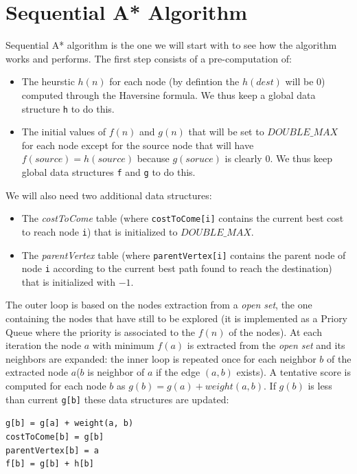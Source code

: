 \documentclass[twocolumn, switch]{article} %
\begin{document}
\section{Sequential A* Algorithm}
Sequential A* algorithm is the one we will start with to see how the algorithm works and performs.
The first step consists of a pre-computation of:
\begin{itemize}
  \item The heurstic $h(n)$ for each node (by defintion the $h(dest)$ will
        be 0) computed through the Haversine formula. We thus keep a global data
        structure \texttt{h} to do this.
  \item The initial values of $f(n)$ and $g(n)$ that will be set to $DOUBLE\_MAX$ for each
        node except for the source node that will have $f(source) = h(source)$ because 
        $g(soruce)$ is clearly $0$. We thus keep global data structures \texttt{f} and \texttt{g} to do this.
\end{itemize}
We will also need two additional data structures:
\begin{itemize}
  \item The \textit{costToCome} table (where \texttt{costToCome[i]} contains the current
        best cost to reach node \texttt{i}) that is initialized
        to $DOUBLE\_MAX$.
  \item The \textit{parentVertex} table (where \texttt{parentVertex[i]} contains the
        parent node of node \texttt{i} according to the current best path found to reach
        the destination) that is initialized with $-1$.
\end{itemize}
The outer loop is based on the nodes extraction from a \textit{open set}, the one containing
the nodes that have still to be explored (it is implemented as a Priory Queue where the priority
is associated to the $f(n)$ of the nodes). At each iteration the node $a$ with minimum $f(a)$ is
extracted from the \textit{open set} and its neighbors are expanded: the inner loop is repeated once for each neighbor $b$ of the
extracted node $a$($b$ is neighbor of $a$ if the edge $(a, b)$ exists). A tentative score is computed
for each node $b$ as $g(b) = g(a) + weight(a, b)$. If $g(b)$ is less than current \texttt{g[b]} these data structures
are updated: 
\begin{flushleft}
  \texttt{g[b] = g[a] + weight(a, b)}\\
  \texttt{costToCome[b] = g[b]}\\
  \texttt{parentVertex[b] = a}\\
  \texttt{f[b] = g[b] + h[b]}
\end{flushleft}
\end{document}
